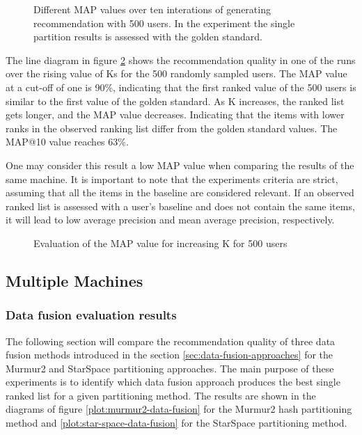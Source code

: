 \begin{figure}[!htb]
    \centering
    
    \caption{Different MAP values over ten interations of generating recommendation with 500 users. In the experiment the single partition results is assessed with the golden standard.}
    \label{plot:single-partition-boxplot}
\end{figure}



The line diagram in figure \ref{plot:single-partition} shows the recommendation quality in one of the runs over the rising value of Ks for the 500 randomly sampled users. The MAP value at a cut-off of one is 90\%, indicating that the first ranked value of the 500 users is similar to the first value of the golden standard. As K increases, the ranked list gets longer, and the MAP value decreases. Indicating that the items with lower ranks in the observed ranking list differ from the golden standard values. The MAP@10 value reaches 63\%. 


One may consider this result a low MAP value when comparing the results of the same machine. It is important to note that the experiments criteria are strict, assuming that all the items in the baseline are considered relevant. If an observed ranked list is assessed with a user's baseline and does not contain the same items, it will lead to low average precision and mean average precision, respectively.

\begin{figure}[!htb]
    \centering
    
    \caption{Evaluation of the MAP value for increasing K for 500 users}
    \label{plot:single-partition}
\end{figure}

\subsection{Multiple Machines}
\label{subsec:eval-multiple-machines}

\subsubsection{Data fusion evaluation results}
\label{subsubsec:eval-data-fusion}
The following section will compare the recommendation quality of three data fusion methods introduced in the section \ref{sec:data-fusion-approaches} for the Murmur2 and StarSpace partitioning approaches. The main purpose of these experiments is to identify which data fusion approach produces the best single ranked list for a given partitioning method. The results are shown in the diagrams of figure \ref{plot:murmur2-data-fusion} for the Murmur2 hash partitioning method and \ref{plot:star-space-data-fusion} for the StarSpace partitioning method.


